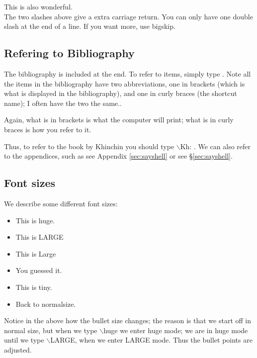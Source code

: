 \documentclass[12pt,reqno]{amsart}
\numberwithin{equation}{section}
\begin{document}
This is also wonderful. \\

The two slashes above give a extra carriage return. You can only
have one double slash at the end of a line. If you want more, use
bigskip.


\subsection{Refering to Bibliography}

The bibliography is included at the end. To refer to items, simply
type \cite{RSZ}. Note all the items in the bibliography have two
abbreviations, one in brackets (which is what is displayed in the
bibliography), and one in curly braces (the shortcut name); I
often have the two the same..

Again, what is in brackets is what the computer will print; what
is in curly braces is how you refer to it.

Thus, to refer to the book by Khinchin you should type
$\backslash$Kh: \cite{Kh}. We can also refer to the appendices,
such as see Appendix \ref{sec:sayshell} or see
\S\ref{sec:sayshell}.

\subsection{Font sizes}

We describe some different font sizes:

\begin{itemize}

\item \huge This is huge.

\item \LARGE This is LARGE

\item \Large This is Large

\item \normalsize You guessed it.

\item \tiny This is tiny.

\item \normalsize Back to normalsize.

\end{itemize}

Notice in the above how the bullet size changes; the reason is
that we start off in normal size, but when we type
$\backslash$huge we enter huge mode; we are in huge mode until we
type $\backslash$LARGE, when we enter LARGE mode. Thus the bullet
points are adjusted.
\end{document}
